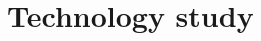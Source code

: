 \documentclass[9pt, twocolumn]{phdsymp} %
\begin{document}


\section{Technology study}
\end{document}
